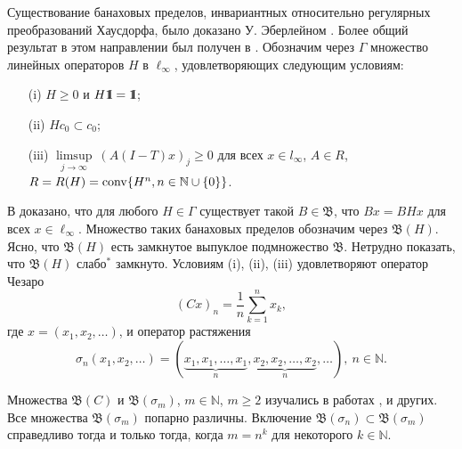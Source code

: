\documentclass[12pt]{article}
\newcommand{\emm}{\mathrm{1\hspace{-0.3em} I}}
\newtheorem{prop}[thm]{Утверждение}
\def\N{{\mathbb{N}}}
\def\B{{\mathfrak{B}}}
\begin{document}
Существование банаховых пределов, инвариантных относительно регулярных преобразований Хаусдорфа, было доказано У. Эберлейном \cite{Eberlein}. Более общий результат в этом направлении был получен в \cite{SS_JFA}.
Обозначим через $\Gamma$ множество линейных операторов $H$ в $\ell_\infty$, удовлетворяющих следующим условиям:
\begin{enumerate}
\item[(i)]
$H\geq0$ и $H\emm=\emm$;

\item[(ii)]
$Hc_0\subset c_0$;

\item[(iii)]
$\limsup\limits_{j\to\infty} \ (A(I-T)x)_j\geq0$ для всех $x\in
l_\infty$, $A\in
R$, $R=R(H)={\rm conv} \{H^n,n\in\mathbb N\cup\{0\}\}$.
\end{enumerate}

В \cite{SS_JFA} доказано, что для любого $H\in \Gamma$ существует такой $B\in\B$, что  $Bx=BHx$ для всех $x\in \ell_\infty$. Множество таких банаховых пределов обозначим через $\B(H)$. Ясно, что $\B(H)$ есть замкнутое выпуклое подмножество $\B$. Нетрудно показать, что $\B(H)$ слабо$^*$ замкнуто. Условиям (i), (ii), (iii) удовлетворяют оператор Чезаро
\begin{equation}\label{cesaro}
(Cx)_n=\frac1n\sum_{k=1}^n x_k,
\end{equation}
где $x=(x_1, x_2, \dots)$,
и оператор растяжения
$$\sigma_n(x_1, x_2, \dots)=(\underbrace{x_1, x_1, \dots, x_1}_{n}, \underbrace{x_2, x_2, \dots, x_2}_{n}, \dots), \ n\in\N.$$

Множества $\B(C)$ и $\mathfrak B(\sigma_m)$, $m\in \N$, $m\ge 2$ изучались в работах \cite{SS_JFA}, \cite{ASSU2} и других. Все множества $\mathfrak B(\sigma_m)$ попарно различны. Включение $\mathfrak B(\sigma_n) \subset \mathfrak B(\sigma_m)$ справедливо тогда и только тогда, когда $m=n^k$ для некоторого $k\in \N$.


%
%
%
\end{document}
